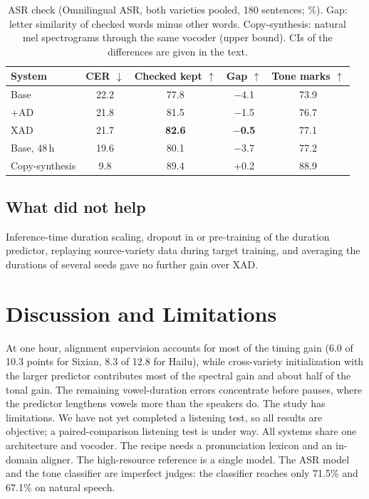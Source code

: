 \documentclass[conference,a4paper]{IEEEtran}
\begin{document}
\begin{table}[t]
\centering
\caption{ASR check (Omnilingual ASR, both varieties pooled, 180 sentences; \%). Gap: letter similarity of checked words minus other words. Copy-synthesis: natural mel spectrograms through the same vocoder (upper bound). CIs of the differences are given in the text.}
\label{tab:asr}
\footnotesize
\setlength{\tabcolsep}{3.5pt}
\begin{tabular}{lcccc}
\toprule
System & CER $\downarrow$ & Checked kept $\uparrow$ & Gap $\uparrow$ & Tone marks $\uparrow$ \\
\midrule
Base          & 22.2 & 77.8 & $-$4.1 & 73.9 \\
+AD           & 21.8 & 81.5 & $-$1.5 & 76.7 \\
XAD           & 21.7 & \textbf{82.6} & \textbf{$-$0.5} & 77.1 \\
Base, 48\,h   & 19.6 & 80.1 & $-$3.7 & 77.2 \\
\midrule
Copy-synthesis & 9.8 & 89.4 & +0.2 & 88.9 \\
\bottomrule
\end{tabular}
\end{table}

\subsection{What did not help}
Inference-time duration scaling, dropout in or pre-training of the duration predictor, replaying source-variety data during target training, and averaging the durations of several seeds gave no further gain over XAD.

\section{Discussion and Limitations}
At one hour, alignment supervision accounts for most of the timing gain (6.0 of 10.3 points for Sixian, 8.3 of 12.8 for Hailu), while cross-variety initialization with the larger predictor contributes most of the spectral gain and about half of the tonal gain. The remaining vowel-duration errors concentrate before pauses, where the predictor lengthens vowels more than the speakers do. %
The study has limitations. We have not yet completed a listening test, so all results are objective; a paired-comparison listening test is under way. %
All systems share one architecture and vocoder. The recipe needs a pronunciation lexicon and an in-domain aligner. The high-resource reference is a single model. The ASR model and the tone classifier are imperfect judges: the classifier reaches only 71.5\% and 67.1\% on natural speech.
\end{document}
